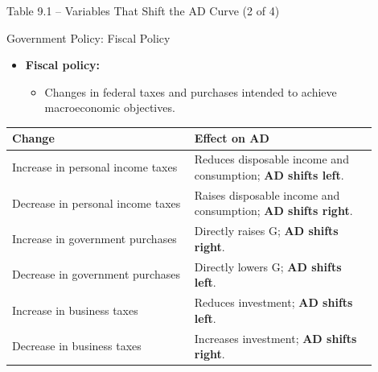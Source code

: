 \documentclass[aspectratio=169]{beamer}
\begin{document}
\begin{frame}{Table 9.1 -- Variables That Shift the AD Curve (2 of 4)}
\transfade
\begin{block}{Government Policy: Fiscal Policy}
\end{block}
\begin{itemize}[<+->]
  \item \textbf{Fiscal policy:}
  \begin{itemize}[<+->]
    \item Changes in federal taxes and purchases intended to achieve macroeconomic objectives.
  \end{itemize}
\end{itemize}
\begin{table}[h]
\centering
\begin{tabular}{p{0.45\linewidth} p{0.45\linewidth}}
\toprule
\textbf{Change} & \textbf{Effect on AD} \\
\midrule
Increase in personal income taxes & Reduces disposable income and consumption; \textbf{AD shifts left}. \\
Decrease in personal income taxes & Raises disposable income and consumption; \textbf{AD shifts right}. \\
Increase in government purchases & Directly raises G; \textbf{AD shifts right}. \\
Decrease in government purchases & Directly lowers G; \textbf{AD shifts left}. \\
Increase in business taxes & Reduces investment; \textbf{AD shifts left}. \\
Decrease in business taxes & Increases investment; \textbf{AD shifts right}. \\
\bottomrule
\end{tabular}
\end{table}
\end{frame}
\end{document}
